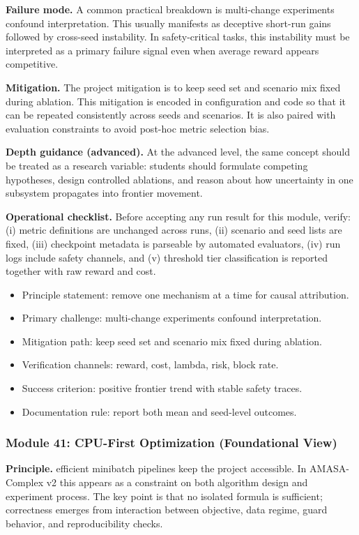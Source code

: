 \documentclass[conference]{IEEEtran}
\begin{document}
\textbf{Failure mode.} A common practical breakdown is multi-change experiments confound interpretation. This usually manifests as deceptive short-run gains followed by cross-seed instability. In safety-critical tasks, this instability must be interpreted as a primary failure signal even when average reward appears competitive.

\textbf{Mitigation.} The project mitigation is to keep seed set and scenario mix fixed during ablation. This mitigation is encoded in configuration and code so that it can be repeated consistently across seeds and scenarios. It is also paired with evaluation constraints to avoid post-hoc metric selection bias.

\textbf{Depth guidance (advanced).} At the advanced level, the same concept should be treated as a research variable: students should formulate competing hypotheses, design controlled ablations, and reason about how uncertainty in one subsystem propagates into frontier movement.

\textbf{Operational checklist.} Before accepting any run result for this module, verify: (i) metric definitions are unchanged across runs, (ii) scenario and seed lists are fixed, (iii) checkpoint metadata is parseable by automated evaluators, (iv) run logs include safety channels, and (v) threshold tier classification is reported together with raw reward and cost.

\begin{itemize}[leftmargin=*]
  \item Principle statement: remove one mechanism at a time for causal attribution.
  \item Primary challenge: multi-change experiments confound interpretation.
  \item Mitigation path: keep seed set and scenario mix fixed during ablation.
  \item Verification channels: reward, cost, lambda, risk, block rate.
  \item Success criterion: positive frontier trend with stable safety traces.
  \item Documentation rule: report both mean and seed-level outcomes.
\end{itemize}


\subsubsection{Module 41: CPU-First Optimization (Foundational View)}
\textbf{Principle.} efficient minibatch pipelines keep the project accessible. In AMASA-Complex v2 this appears as a constraint on both algorithm design and experiment process. The key point is that no isolated formula is sufficient; correctness emerges from interaction between objective, data regime, guard behavior, and reproducibility checks.
\end{document}
